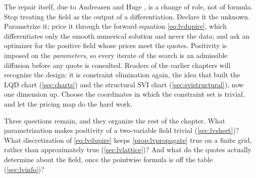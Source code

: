 The repair itself, due to Andreasen and Huge
\citep{AndreasenHuge2011}, is a change of role, not of formula.  Stop
treating the field as the output of a differentiation.  Declare it the
unknown.  Parametrize it; price it through the forward equation
\eqref{eq:lvdupire}, which differentiates only the smooth numerical
solution and never the data; and ask an optimizer for the positive
field whose prices meet the quotes.  Positivity is imposed on the
\emph{parameters}, so every iterate of the search is an admissible
diffusion before any quote is consulted.  Readers of the earlier
chapters will recognize the design: it is constraint elimination
again, the idea that built the LQD chart (\cref{sec:charts}) and the
structural SVI chart (\cref{sec:svistructural}), now one dimension up.
Choose the coordinates in which the constraint set is trivial, and let
the pricing map do the hard work.

Three questions remain, and they organize the rest of the chapter.
What parametrization makes positivity of a two-variable field trivial
(\cref{sec:lvsheet})?  What discretization of \eqref{eq:lvdupire}
keeps \cref{prop:lvpropagate} true on a finite grid, rather than
approximately true (\cref{sec:lvlattice})?  And what do the quotes
actually determine about the field, once the pointwise formula is off
the table (\cref{sec:lvinfo})?
